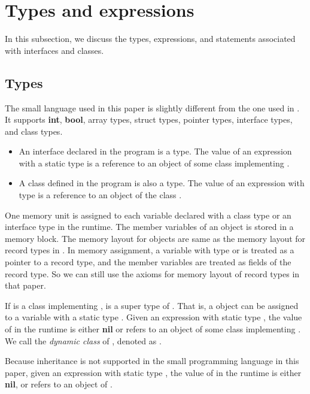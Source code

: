 \documentclass[fleqn]{llncs}
\begin{document}
\section{Types and expressions}\label{SEC-TYPE-EXPRESSION}
In this subsection, we discuss the types, expressions, and statements associated with interfaces and classes.

\subsection{Types}
The small language used in this paper is slightly different from the one used in \cite{DBLP:conf/ictac/ZhaoL13}.
It supports \textbf{int}, \textbf{bool}, array types, struct types, pointer types, interface types, and class types.
\begin{itemize}
\item An interface  declared in the program is a type. The value of an expression with a static type  is a reference to
    an object of some class implementing .
\item A class  defined in the program is also a type. The value of an expression with type  is a reference to
    an object of the class .
\end{itemize}
One memory unit is assigned to each variable declared with a class type or an
interface type in the runtime. The member variables of an object is stored in a memory block.
The memory layout for objects are same as the memory layout for record types in \cite{DBLP:conf/ictac/ZhaoL13}.
 In memory assignment, a variable with type  or  is treated as a pointer to a record type, and the member variables are treated as fields of the record type.
So we can still use the axioms for memory layout of record types in that paper.

If  is a class implementing ,  is a super type of . That is, a  object can be assigned to a variable with a static type .
Given an expression  with static type , the value of  in the runtime is either \textbf{nil} or refers to an object of some class 
implementing . We call  the \emph{dynamic class} of , denoted as .

Because inheritance is not supported in the small programming language in this paper, given an expression  with static type , the value of  in the runtime is either \textbf{nil}, or refers to an object of .
\end{document}
